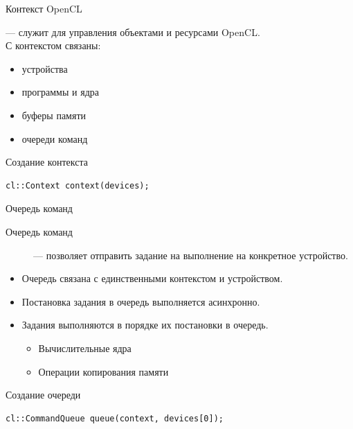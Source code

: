 \documentclass[@BEAMER_OPTIONS@]{beamer}
\begin{document}
\begin{frame}[fragile]{Контекст OpenCL}
    \begin{description}[\;\;]
        \item[Контекст] --- служит для управления объектами и ресурсами
            OpenCL.\\
            С контекстом связаны:
            \begin{itemize}
                \item устройства
                \item программы и ядра
                \item буферы памяти
                \item очереди команд
            \end{itemize}
    \end{description}
    \begin{exampleblock}{Создание контекста}
        \begin{lstlisting}
cl::Context context(devices);
        \end{lstlisting}
    \end{exampleblock}
\end{frame}

\begin{frame}[fragile]{Очередь команд}
    \begin{description}
        \item[Очередь команд] --- позволяет отправить задание на выполнение на
            конкретное устройство.
    \end{description}
    \begin{itemize}
        \item Очередь связана с единственными контекстом и устройством.
        \item Постановка задания в очередь выполняется асинхронно.
        \item Задания выполняются в порядке их постановки в очередь.
            \begin{itemize}
                \item Вычислительные ядра
                \item Операции копирования памяти
            \end{itemize}
    \end{itemize}
    \begin{exampleblock}{Создание очереди}
        \begin{lstlisting}
cl::CommandQueue queue(context, devices[0]);
        \end{lstlisting}
    \end{exampleblock}
\end{frame}
\end{document}
